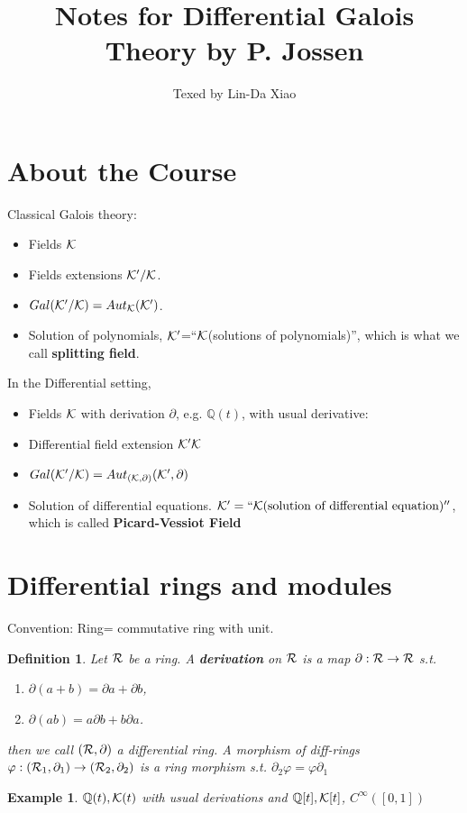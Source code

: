 \documentclass[11pt]{article}
\title{\bf Notes for Differential Galois Theory by P. Jossen}
\author{Texed by Lin-Da Xiao} %
\newtheorem{dfn}[thm]{Definition}
\newtheorem{ex}[thm]{Example}
\newcommand{\pd}{\partial}
\newcommand{\ratl}{\mathbb Q}
\newcommand{\calk}{{\cal K}}
\newcommand{\calr}{{\cal R}}
\begin{document}
\maketitle
\tableofcontents
\newpage
\section*{About the Course}
Classical Galois theory:
\begin{itemize}
\item Fields $\calk$
\item 
 Fields extensions $\calk'/\calk$.
 \item 
$Gal(\calk'/\calk)= Aut_\calk(\calk')$.
\item
Solution of polynomials, $\calk'$=``$\calk$(solutions of polynomials)'', which is what we call \textbf{splitting field}.
\end{itemize}
 
\noindent In the Differential setting, 
\begin{itemize}
\item Fields $\calk$ with derivation $\pd$, e.g. $\ratl(t)$, with usual derivative:
\item Differential field extension $\calk'\calk$
\item $Gal(\calk'/\calk)=Aut_{(\calk,\pd)}(\calk',\pd)$
\item Solution of differential equations. $\calk'=``\calk(\text{solution of differential equation})''$, which is called \textbf{Picard-Vessiot Field}
\end{itemize}

\section{Differential rings and modules}
Convention: Ring= commutative ring with unit.
\begin{dfn}
Let $\calr$ be a ring. A \textbf{derivation} on  $\calr$ is a map $\pd:\calr \rightarrow \calr$ s.t.
\begin{enumerate}
\item $\pd (a+b)=\pd a+\pd b$,
\item $\pd(ab)=a\pd b+b\pd a$.
\end{enumerate}
then we call $(\calr,\pd)$ a differential ring.
A morphism of diff-rings $\varphi:(\calr_1,\pd_1 )\rightarrow (\calr_2,\pd_2)$ is a ring morphism s.t. $\pd_2\varphi=\varphi\pd_1$
\end{dfn} 
\begin{ex}
$\ratl(t),\calk(t)$ with usual derivations and $\ratl[t],\calk[t]$, $C^\infty([0,1])$
\end{ex}
\end{document}
